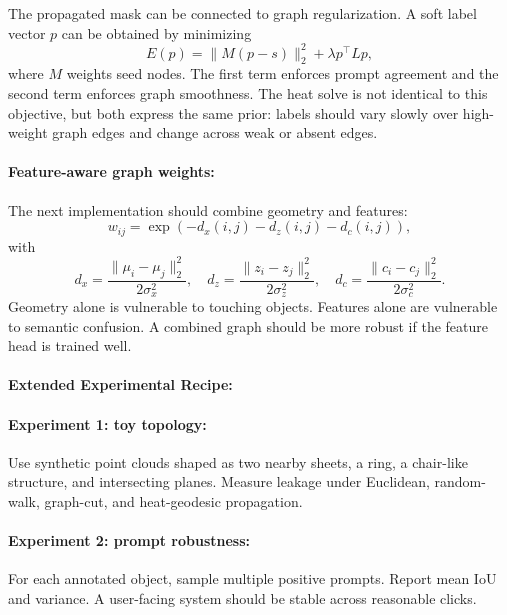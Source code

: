 \documentclass{article}
\begin{document}
The propagated mask can be connected to graph regularization. A soft label vector $p$ can be obtained by minimizing
\begin{equation}
  E(p)=\|M(p-s)\|_2^2+\lambda p^\top Lp,
\end{equation}
where $M$ weights seed nodes. The first term enforces prompt agreement and the second term enforces graph smoothness. The heat solve is not identical to this objective, but both express the same prior: labels should vary slowly over high-weight graph edges and change across weak or absent edges.

\paragraph{Feature-aware graph weights:}

The next implementation should combine geometry and features:
\begin{equation}
  w_{ij}=\exp\left(-d_x(i,j)-d_z(i,j)-d_c(i,j)\right),
\end{equation}
with
\begin{equation}
  d_x=\frac{\|\mu_i-\mu_j\|_2^2}{2\sigma_x^2},\quad
  d_z=\frac{\|z_i-z_j\|_2^2}{2\sigma_z^2},\quad
  d_c=\frac{\|c_i-c_j\|_2^2}{2\sigma_c^2}.
\end{equation}
Geometry alone is vulnerable to touching objects. Features alone are vulnerable to semantic confusion. A combined graph should be more robust if the feature head is trained well.

\paragraph{Extended Experimental Recipe:}

\paragraph{Experiment 1: toy topology:}

Use synthetic point clouds shaped as two nearby sheets, a ring, a chair-like structure, and intersecting planes. Measure leakage under Euclidean, random-walk, graph-cut, and heat-geodesic propagation.

\paragraph{Experiment 2: prompt robustness:}

For each annotated object, sample multiple positive prompts. Report mean IoU and variance. A user-facing system should be stable across reasonable clicks.
\end{document}
